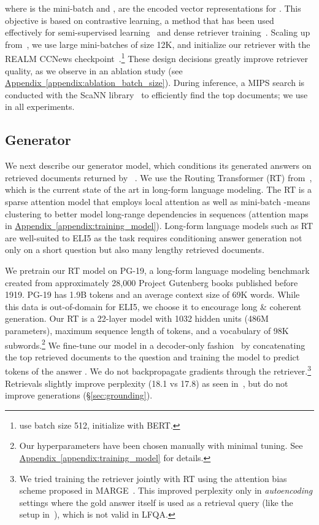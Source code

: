 \documentclass[11pt]{article}
\newcommand{\namedref}[2]{\hyperref[#2]{#1~\ref*{#2}}}
\newcommand{\appendixref}[1]{\namedref{Appendix}{#1}}
\newcommand{\retriever}[1]{\textsc{c-REALM}}
\begin{document}
where  is the mini-batch and ,  are the encoded vector representations for . This objective is based on contrastive learning, a method that has been used effectively for semi-supervised learning~\citep{chen2020simple} and dense retriever training~\citep{karpukhin2020dense}. Scaling up from~\citet{jernite2020}, we use large mini-batches of size 12K, and initialize our retriever with the REALM CCNews checkpoint~\citep{guu2020realm}.\footnote{\citet{jernite2020} use batch size 512, initialize with BERT.} These design decisions greatly improve retriever quality, as we observe in an ablation study (see \appendixref{appendix:ablation_batch_size}). During inference, a MIPS search is conducted with the ScaNN library~\citep{avq_2020} to efficiently find the top  documents; we use  in all experiments.

\subsection{Generator}

We next describe our generator model, which conditions its generated answers on retrieved documents returned by \retriever~. We use the Routing Transformer (RT) from~\citet{roy2020efficient}, which is the current
state of the art in long-form language modeling. The RT is a sparse attention model that employs 
local attention as well as mini-batch -means clustering to better model long-range 
dependencies in sequences (attention maps in \appendixref{appendix:training_model}). Long-form language models such as RT are well-suited to ELI5 as the task requires conditioning answer generation not only on a short question but also many lengthy retrieved documents. 

We pretrain our RT model on PG-19, a long-form language
modeling benchmark~\citep{rae2020compressive} created from approximately 28,000 Project Gutenberg books published before 1919. PG-19 has 1.9B tokens and an average context size of 69K words. While this data is out-of-domain for ELI5, we choose it to encourage long \& coherent generation. Our RT is a 22-layer model with 1032 hidden units (486M parameters), maximum sequence length of  tokens, and a vocabulary of 98K subwords.\footnote{Our hyperparameters have been chosen manually with minimal tuning. See \appendixref{appendix:training_model} for details.}
We fine-tune our model in a decoder-only 
fashion~\citep{liu2018generating, wolf2019transfertransfo} by concatenating the top  retrieved documents to the question
 and training the model to predict tokens of the answer . We do not backpropagate gradients through the 
retriever.\footnote{We tried training the retriever jointly with RT using the attention bias scheme proposed in MARGE~\citep{lewis2020pre}. This 
improved perplexity only in \textit{autoencoding} settings where the gold answer itself is used as 
a retrieval query (like the setup in~\citealp{lewis2020pre}), which is not valid in LFQA.} Retrievals slightly improve perplexity (18.1 vs 17.8) as seen in~\citet{wang2020fly}, but do not improve generations (\S \ref{sec:grounding}).
\end{document}
